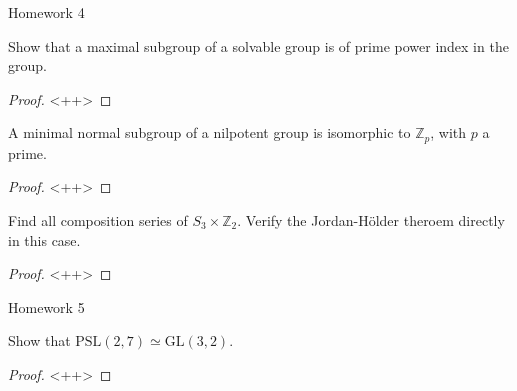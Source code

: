 \documentclass[12pt]{article}
\newcommand{\Z}{\mathbb{Z}}
\theoremstyle{definition}
\newenvironment{problem}[2][Problem]{\begin{trivlist}
\item[\hskip \labelsep {\bfseries #1}\hskip \labelsep {\bfseries #2.}]}{\end{trivlist}}
\begin{document}
\begin{section}{Homework 4}
\begin{problem}{6}
    Show that a maximal subgroup of a solvable group is of prime power index in the group.
    \begin{proof}
    <++>
    \end{proof}
\end{problem}
\begin{problem}{7}
    A minimal normal subgroup of a nilpotent group is isomorphic to $\Z_p$, with $p$ a prime.
    \begin{proof}
        <++>
    \end{proof}
\end{problem}
\begin{problem}{8}
    Find all composition series of $S_3 \times \Z_2$. Verify the Jordan-H\"older theroem directly in this case.
    \begin{proof}
        <++>
    \end{proof}
\end{problem}
\end{section}
\begin{section}{Homework 5}
\begin{problem}{7}
    Show that $\text{PSL}(2,7) \simeq \text{GL}(3,2)$.
    \begin{proof}
    <++>
    \end{proof}
\end{problem}
\end{section}
\end{document}
